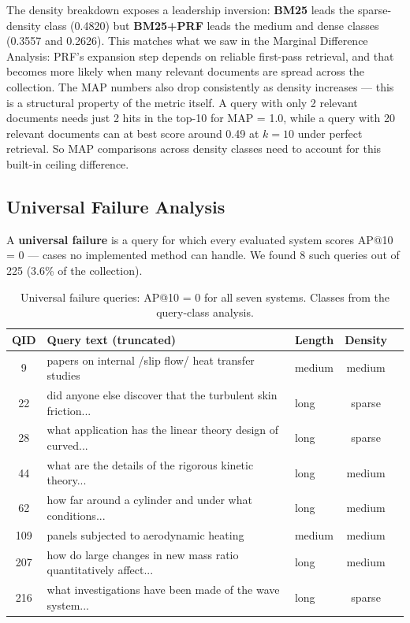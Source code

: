 \documentclass{svproc}
\begin{document}
    The density breakdown exposes a leadership inversion: \textbf{BM25} leads the sparse-density class (0.4820) but \textbf{BM25+PRF} leads the medium and dense classes (0.3557 and 0.2626). This matches what we saw in the Marginal Difference Analysis: PRF's expansion step depends on reliable first-pass retrieval, and that becomes more likely when many relevant documents are spread across the collection. The MAP numbers also drop consistently as density increases --- this is a structural property of the metric itself. A query with only 2 relevant documents needs just 2 hits in the top-10 for MAP = 1.0, while a query with 20 relevant documents can at best score around 0.49 at $k{=}10$ under perfect retrieval. So MAP comparisons across density classes need to account for this built-in ceiling difference.

    \subsection{Universal Failure Analysis}

    A \textbf{universal failure} is a query for which every evaluated system scores AP@10 = 0 — cases no implemented method can handle. We found 8 such queries out of 225 (3.6\% of the collection).

    \begin{table}[H]
    \centering
    \renewcommand{\arraystretch}{1.2}
    \begin{tabular}{cllcc}
    \toprule
    \textbf{QID} & \textbf{Query text (truncated)} & \textbf{Length} & \textbf{Density} \\
    \midrule
    9   & papers on internal /slip flow/ heat transfer studies        & medium & medium \\
    22  & did anyone else discover that the turbulent skin friction... & long   & sparse \\
    28  & what application has the linear theory design of curved...  & long   & sparse \\
    44  & what are the details of the rigorous kinetic theory...      & long   & medium \\
    62  & how far around a cylinder and under what conditions...      & long   & medium \\
    109 & panels subjected to aerodynamic heating                    & medium & medium \\
    207 & how do large changes in new mass ratio quantitatively affect...  & long   & medium \\
    216 & what investigations have been made of the wave system...    & long   & sparse \\
    \bottomrule
    \end{tabular}
    \caption{Universal failure queries: AP@10 = 0 for all seven systems. Classes from the query-class analysis.}
    \label{tab:univfail}
    \end{table}
\end{document}
